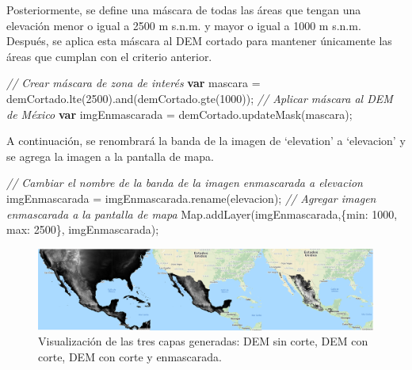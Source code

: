 \documentclass[
  12pt,
  letterpaper,
  twoside]{book}
\newenvironment{Shaded}{\begin{snugshade}}{\end{snugshade}}
\newcommand{\BuiltInTok}[1]{#1}
\newcommand{\CommentTok}[1]{\textcolor[rgb]{0.24,0.58,0.00}{\textit{#1}}}
\newcommand{\DataTypeTok}[1]{\textcolor[rgb]{0.00,0.00,0.00}{#1}}
\newcommand{\DecValTok}[1]{\textcolor[rgb]{0.28,0.53,0.93}{#1}}
\newcommand{\FunctionTok}[1]{\textcolor[rgb]{0.48,0.12,0.64}{#1}}
\newcommand{\KeywordTok}[1]{\textcolor[rgb]{0.00,0.00,0.00}{\textbf{#1}}}
\newcommand{\NormalTok}[1]{#1}
\newcommand{\OperatorTok}[1]{\textcolor[rgb]{0.00,0.00,0.00}{#1}}
\newcommand{\StringTok}[1]{\textcolor[rgb]{0.87,0.29,0.22}{#1}}
\begin{document}
Posteriormente, se define una máscara de todas las áreas que tengan una elevación menor o igual a 2500 m s.n.m. y mayor o igual a 1000 m s.n.m. Después, se aplica esta máscara al DEM cortado para mantener únicamente las áreas que cumplan con el criterio anterior.

\begin{Shaded}
\begin{Highlighting}[]
\CommentTok{// Crear máscara de zona de interés}
\KeywordTok{var}\NormalTok{ mascara }\OperatorTok{=}\NormalTok{ demCortado}\OperatorTok{.}\FunctionTok{lte}\NormalTok{(}\DecValTok{2500}\NormalTok{)}\OperatorTok{.}\FunctionTok{and}\NormalTok{(demCortado}\OperatorTok{.}\FunctionTok{gte}\NormalTok{(}\DecValTok{1000}\NormalTok{))}\OperatorTok{;}
\CommentTok{// Aplicar máscara al DEM de México}
\KeywordTok{var}\NormalTok{ imgEnmascarada }\OperatorTok{=}\NormalTok{ demCortado}\OperatorTok{.}\FunctionTok{updateMask}\NormalTok{(mascara)}\OperatorTok{;}
\end{Highlighting}
\end{Shaded}

A continuación, se renombrará la banda de la imagen de `elevation' a `elevacion' y se agrega la imagen a la pantalla de mapa.

\begin{Shaded}
\begin{Highlighting}[]
\CommentTok{// Cambiar el nombre de la banda de la imagen enmascarada a elevacion}
\NormalTok{imgEnmascarada }\OperatorTok{=}\NormalTok{ imgEnmascarada}\OperatorTok{.}\FunctionTok{rename}\NormalTok{(}\StringTok{\textquotesingle{}elevacion\textquotesingle{}}\NormalTok{)}\OperatorTok{;}
\CommentTok{// Agregar imagen enmascarada a la pantalla de mapa}
\BuiltInTok{Map}\OperatorTok{.}\FunctionTok{addLayer}\NormalTok{(imgEnmascarada}\OperatorTok{,}\NormalTok{\{}\DataTypeTok{min}\OperatorTok{:} \DecValTok{1000}\OperatorTok{,} \DataTypeTok{max}\OperatorTok{:} \DecValTok{2500}\NormalTok{\}}\OperatorTok{,} \StringTok{\textquotesingle{}imgEnmascarada\textquotesingle{}}\NormalTok{)}\OperatorTok{;}
\end{Highlighting}
\end{Shaded}

\begin{figure}[H]

{\centering \includegraphics[width=0.95\linewidth]{Img/ejercicioAMaps} 

}

\caption{Visualización de las tres capas generadas: DEM sin corte, DEM con corte, DEM con corte y enmascarada.}\label{fig:unnamed-chunk-88}
\end{figure}
\end{document}

